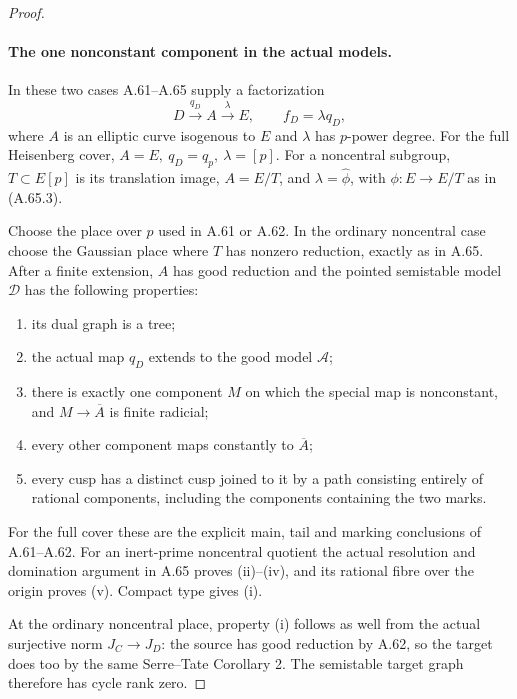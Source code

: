 \begin{proof}
\paragraph{The one nonconstant component in the actual models.}
In these two cases A.61--A.65 supply a factorization
\[
       D\xrightarrow{q_D} A\xrightarrow{\lambda}E,
       \qquad f_D=\lambda q_D ,
                                                               \tag{A.66.5}
\]
where \(A\) is an elliptic curve isogenous to \(E\) and
\(\lambda\) has \(p\)-power degree. For the full Heisenberg
cover, \(A=E,\ q_D=q_p,\ \lambda=[p]\). For a noncentral
subgroup, \(T\subset E[p]\) is its translation image,
\(A=E/T\), and \(\lambda=\widehat\phi\), with
\(\phi:E\to E/T\) as in (A.65.3).

Choose the place over \(p\) used in A.61 or A.62. In the
ordinary noncentral case choose the Gaussian place where
\(T\) has nonzero reduction, exactly as in A.65. After a
finite extension, \(A\) has good reduction and the pointed
semistable model \(\mathcal D\) has the following properties:

\begin{enumerate}
\item its dual graph is a tree;
\item the actual map \(q_D\) extends to the good model
\(\mathcal A\);
\item there is exactly one component \(M\) on which the
special map is nonconstant, and
\(M\to\overline A\) is finite radicial;
\item every other component maps constantly to
\(\overline A\);
\item every cusp has a distinct cusp joined to it by a path
consisting entirely of rational components, including the
components containing the two marks.
\end{enumerate}

For the full cover these are the explicit main, tail and
marking conclusions of A.61--A.62. For an inert-prime
noncentral quotient the actual resolution and domination
argument in A.65 proves (ii)--(iv), and its rational fibre
over the origin proves (v). Compact type gives (i).

At the ordinary noncentral place, property (i) follows
as well from the actual surjective norm \(J_C\to J_D\):
the source has good reduction by A.62, so the target
does too by the same Serre--Tate Corollary 2. The
semistable target graph therefore has cycle rank zero.


\end{proof}
